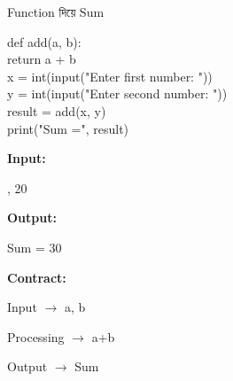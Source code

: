 \begin{codeoutputbox}{Function দিয়ে Sum}

\noindent
\begin{minipage}[t]{0.58\linewidth}
\codeheading

\begin{english}
\ttfamily
def add(a, b):\\
\hspace*{4mm}return a + b\\[0.5mm]
x = int(input("Enter first number: "))\\
y = int(input("Enter second number: "))\\[0.5mm]
result = add(x, y)\\
print("Sum =", result)
\end{english}

\end{minipage}
\hfill
\begin{minipage}[t]{0.38\linewidth}
\outputheading

\textbf{Input:}

\textenglish{, 20}

\medskip

\textbf{Output:}

\textenglish{\ttfamily Sum = 30}

\medskip

\textbf{Contract:}

Input
\(\rightarrow\)
\textenglish{\ttfamily a, b}

Processing
\(\rightarrow\)
\textenglish{\ttfamily a+b}

Output
\(\rightarrow\)
Sum

\end{minipage}

\end{codeoutputbox}



